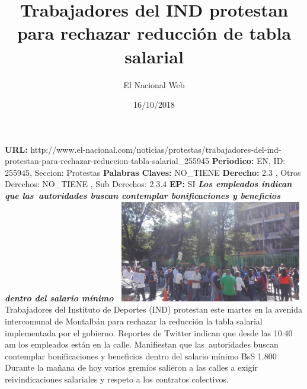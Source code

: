 \documentclass{article}%
\title{\textbf{Trabajadores del IND protestan para rechazar reducción de tabla salarial}}%
\author{El Nacional Web}%
\date{16/10/2018}%
\begin{document}
%
\normalsize%
\maketitle%
\textbf{URL: }%
http://www.el{-}nacional.com/noticias/protestas/trabajadores{-}del{-}ind{-}protestan{-}para{-}rechazar{-}reduccion{-}tabla{-}salarial\_255945\newline%
%
\textbf{Periodico: }%
EN, %
ID: %
255945, %
Seccion: %
Protestas\newline%
%
\textbf{Palabras Claves: }%
NO\_TIENE\newline%
%
\textbf{Derecho: }%
2.3%
, Otros Derechos: %
NO\_TIENE%
, Sub Derechos: %
2.3.4%
\newline%
%
\textbf{EP: }%
SI\newline%
\newline%
%
\textbf{\textit{Los empleados indican que las~autoridades buscan contemplar bonificaciones y beneficios dentro del salario mínimo~}}%
\newline%
\newline%
%
\includegraphics[width=300px]{60.jpg}%
\newline%
%
Trabajadores del Instituto de Deportes (IND) protestan este martes en la avenida intercomunal de Montalbán para rechazar la reducción la tabla salarial implementada por el gobierno.%
\newline%
%
Reportes de Twitter indican que desde las 10:40 am los empleados están en la calle. Manifiestan que las~autoridades buscan contemplar bonificaciones y beneficios dentro del salario mínimo BsS 1.800%
\newline%
%
Durante la mañana de hoy varios gremios salieron a las calles a exigir reivindicaciones salariales y respeto a los contratos colectivos.%
\newline%
%
\end{document}

